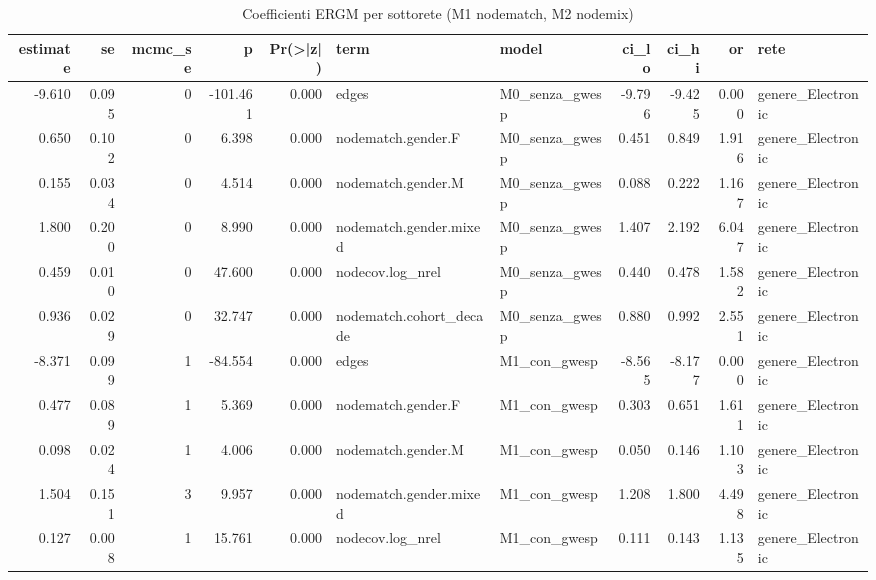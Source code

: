 \begin{table}
\centering
\caption{Coefficienti ERGM per sottorete (M1 nodematch, M2 nodemix)}
\label{tab:t4_ergm_coefficienti}
\begin{tabular}{rrrrrllrrrl}
\toprule
 estimate &    se &  mcmc\_se &        p &  Pr(>|z|) &                    term &            model &   ci\_lo &   ci\_hi &      or &                        rete \\
\midrule
   -9.610 & 0.095 &        0 & -101.461 &     0.000 &                   edges &   M0\_senza\_gwesp &  -9.796 &  -9.425 &   0.000 &           genere\_Electronic \\
    0.650 & 0.102 &        0 &    6.398 &     0.000 &      nodematch.gender.F &   M0\_senza\_gwesp &   0.451 &   0.849 &   1.916 &           genere\_Electronic \\
    0.155 & 0.034 &        0 &    4.514 &     0.000 &      nodematch.gender.M &   M0\_senza\_gwesp &   0.088 &   0.222 &   1.167 &           genere\_Electronic \\
    1.800 & 0.200 &        0 &    8.990 &     0.000 &  nodematch.gender.mixed &   M0\_senza\_gwesp &   1.407 &   2.192 &   6.047 &           genere\_Electronic \\
    0.459 & 0.010 &        0 &   47.600 &     0.000 &        nodecov.log\_nrel &   M0\_senza\_gwesp &   0.440 &   0.478 &   1.582 &           genere\_Electronic \\
    0.936 & 0.029 &        0 &   32.747 &     0.000 & nodematch.cohort\_decade &   M0\_senza\_gwesp &   0.880 &   0.992 &   2.551 &           genere\_Electronic \\
   -8.371 & 0.099 &        1 &  -84.554 &     0.000 &                   edges &     M1\_con\_gwesp &  -8.565 &  -8.177 &   0.000 &           genere\_Electronic \\
    0.477 & 0.089 &        1 &    5.369 &     0.000 &      nodematch.gender.F &     M1\_con\_gwesp &   0.303 &   0.651 &   1.611 &           genere\_Electronic \\
    0.098 & 0.024 &        1 &    4.006 &     0.000 &      nodematch.gender.M &     M1\_con\_gwesp &   0.050 &   0.146 &   1.103 &           genere\_Electronic \\
    1.504 & 0.151 &        3 &    9.957 &     0.000 &  nodematch.gender.mixed &     M1\_con\_gwesp &   1.208 &   1.800 &   4.498 &           genere\_Electronic \\
    0.127 & 0.008 &        1 &   15.761 &     0.000 &        nodecov.log\_nrel &     M1\_con\_gwesp &   0.111 &   0.143 &   1.135 &           genere\_Electronic \\

\end{tabular}
\end{table}

